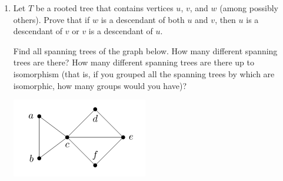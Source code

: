 \documentclass[11pt,a4paper]{article}
\newcommand\setItemNumber[1]{\setcounter{enumi}{\numexpr#1-1\relax}}
\begin{document}
\begin{enumerate}
        \setItemNumber{11}
        \item Let $T$ be a rooted tree that contains vertices $u$, $v$, and $w$ (among possibly others). Prove that if $w$ is a descendant of both $u$ and $v$, then $u$ is a descendant of $v$ or $v$ is a descendant of $u$.

        \setItemNumber{13} Find all spanning trees of the graph below. How many different spanning trees are there? How many different spanning trees are there up to isomorphism (that is, if you grouped all the spanning trees by which are isomorphic, how many groups would you have)?

            \begin{center}
            \includegraphics[width=.45\textwidth]{hw8_graphic2}
            \end{center}

        \end{enumerate}
	
	
	
		
\end{document}
